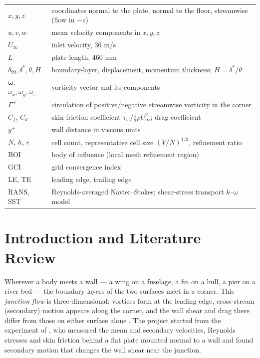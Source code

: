 \documentclass[12pt]{iitdamthes}
\begin{document}
\begin{frontmatter}
\notations
\begin{tabular}{@{}lp{}@{}}
$x, y, z$ & coordinates normal to the plate, normal to the floor, streamwise (flow in $-z$)\\
$u, v, w$ & mean velocity components in $x, y, z$\\
$U_\infty$ & inlet velocity, 36 m/s\\
$L$ & plate length, 460 mm\\
$\delta_{99}, \delta^*, \theta, H$ & boundary-layer, displacement, momentum thickness; $H=\delta^*/\theta$\\
$\boldsymbol{\omega}$, $\omega_x, \omega_y, \omega_z$ & vorticity vector and its components\\
$\Gamma^{\pm}$ & circulation of positive/negative streamwise vorticity in the corner\\
$C_f$, $C_d$ & skin-friction coefficient $\tau_w/\tfrac12\rho U_\infty^2$; drag coefficient\\
$y^+$ & wall distance in viscous units\\
$N$, $h$, $r$ & cell count, representative cell size $(V/N)^{1/3}$, refinement ratio\\
BOI & body of influence (local mesh refinement region)\\
GCI & grid convergence index \citep{celik2008}\\
LE, TE & leading edge, trailing edge\\
RANS, SST & Reynolds-averaged Navier--Stokes; shear-stress transport $k$--$\omega$ model\\
\end{tabular}

\end{frontmatter}

\chapter{Introduction and Literature Review}
Wherever a body meets a wall --- a wing on a fuselage, a fin on a hull, a pier on a river bed ---
the boundary layers of the two surfaces meet in a corner. This \emph{junction flow} is
three-dimensional: vortices form at the leading edge, cross-stream (secondary) motion appears along
the corner, and the wall shear and drag there differ from those on either surface alone
\citep{simpson2001}. The project started from the experiment of \citet{nakayama1984}, who measured
the mean and secondary velocities, Reynolds stresses and skin friction behind a flat plate mounted
normal to a wall and found secondary motion that changes the wall shear near the junction.
\end{document}
